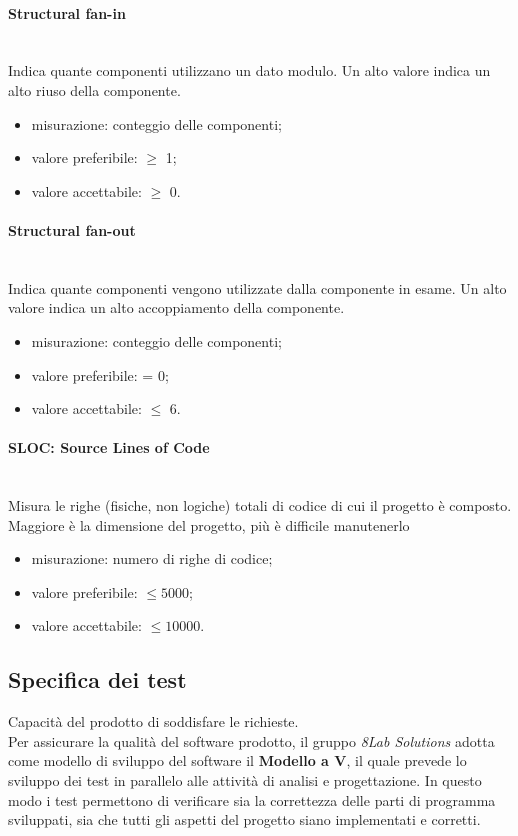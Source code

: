 			\paragraph{Structural fan-in}\mbox{}\\ 
			Indica quante componenti utilizzano un dato modulo. Un alto	valore indica un alto riuso della componente.
			\begin{itemize}
				\item misurazione: conteggio delle componenti;
				\item valore preferibile: $\geq$ 1;
				\item valore accettabile: $\geq$ 0.
			\end{itemize}
			\paragraph{Structural fan-out}\mbox{}\\
			 Indica quante componenti vengono utilizzate dalla componente in esame. Un alto valore indica un alto accoppiamento della componente.
			\begin{itemize}
				\item misurazione: conteggio delle componenti;
				\item valore preferibile: = 0;
				\item valore accettabile: $\leq$ 6.
			\end{itemize}
			\paragraph{SLOC: Source Lines of Code}\mbox{}\\
			Misura le righe (fisiche, non logiche) totali di codice di cui il progetto è composto. Maggiore è la dimensione del progetto, più è difficile manutenerlo
			\begin{itemize}
				\item misurazione: numero di righe di codice;
				\item valore preferibile: $\leq5000$;
				\item valore accettabile: $\leq10000$.
			\end{itemize}

\subsection{Specifica dei test}
Capacità del prodotto di soddisfare le richieste. \\
Per assicurare la qualità del software prodotto, il gruppo \textit{8Lab 	Solutions} adotta come modello di sviluppo del software il \textbf{Modello a V\glo}, il quale prevede lo sviluppo dei test in parallelo alle attività di analisi e progettazione.
In questo modo i test permettono di verificare sia la correttezza delle parti di programma sviluppati, sia che tutti gli aspetti del progetto siano implementati e corretti.\\
